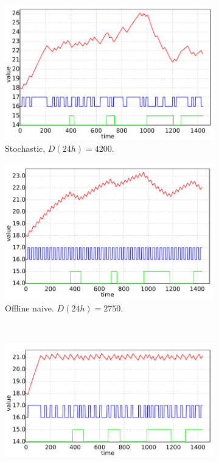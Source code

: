     \begin{figure}[!htb]
        \begin{subfigure}{0.51\textwidth}
            \includegraphics[width=\linewidth]{images/2_a.png}
            \caption{Stochastic, $D(24h)=4200$.} \label{fig:2a}
        \end{subfigure}%
        \hspace*{\fill}
        \begin{subfigure}{0.51\textwidth}
            \includegraphics[width=\linewidth]{images/2_b.png}
            \caption{Offline naive. $D(24h)=2750$.} \label{fig:2b}
        \end{subfigure}%
        \\
        \begin{subfigure}{0.51\textwidth}
            \includegraphics[width=\linewidth]{images/2_c.png}

\end{subfigure}
\end{figure}
